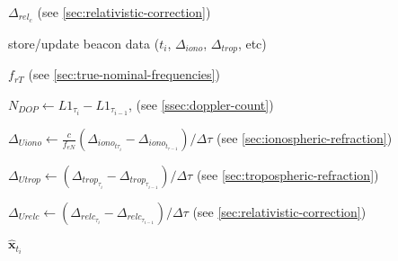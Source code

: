 \begin{algorithm}
{{{{        
        $\Delta_{{rel}_c}$ (see \ref{sec:relativistic-correction})

        {
          store/update beacon data ($t_i$, $\Delta_{iono}$, $\Delta_{trop}$, etc)
        }
        {
          $f_{rT}$ (see \ref{sec:true-nominal-frequencies})

          $N_{DOP} \gets L1_{\tau_i} - L1_{\tau_{i-1}}$, (see \ref{ssec:doppler-count})

          $\Delta_{Uiono} \gets \frac{c}{f_{eN}} ( \Delta_{iono_{t\tau_i}} - \Delta_{iono_{t_{\tau-1}}} ) / \Delta \tau$ (see \ref{sec:ionospheric-refraction})

          $\Delta_{Utrop} \gets ( \Delta_{trop_{\tau_i}} - \Delta_{trop_{\tau_{i-1}}} ) / \Delta \tau$ (see \ref{sec:tropospheric-refraction})

          $\Delta_{Urelc} \gets ( \Delta_{relc_{\tau_i}} - \Delta_{relc_{\tau_{i-1}}} ) / \Delta \tau$ (see \ref{sec:relativistic-correction})

          $\hat{\bm{x}}_{t_i}$
        }
      }
    }
  }
}

\end{algorithm}
